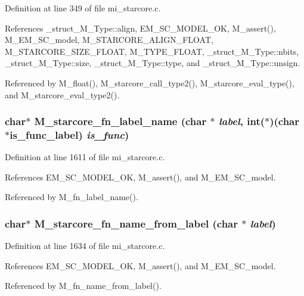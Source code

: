 Definition at line 349 of file mi\_\-starcore.c.

References \_\-struct\_\-M\_\-Type::align, EM\_\-SC\_\-MODEL\_\-OK, M\_\-assert(), M\_\-EM\_\-SC\_\-model, M\_\-STARCORE\_\-ALIGN\_\-FLOAT, M\_\-STARCORE\_\-SIZE\_\-FLOAT, M\_\-TYPE\_\-FLOAT, \_\-struct\_\-M\_\-Type::nbits, \_\-struct\_\-M\_\-Type::size, \_\-struct\_\-M\_\-Type::type, and \_\-struct\_\-M\_\-Type::unsign.

Referenced by M\_\-float(), M\_\-starcore\_\-call\_\-type2(), M\_\-starcore\_\-eval\_\-type(), and M\_\-starcore\_\-eval\_\-type2().
\subsubsection{\setlength{\rightskip}{0pt plus 5cm}char$\ast$ M\_\-starcore\_\-fn\_\-label\_\-name (char $\ast$ {\em label}, int($\ast$)(char $\ast$is\_\-func\_\-label) {\em is\_\-func})}\label{m__starcore_8h_a1277d6e6bef03a3c24b733a0ee2340d}




Definition at line 1611 of file mi\_\-starcore.c.

References EM\_\-SC\_\-MODEL\_\-OK, M\_\-assert(), and M\_\-EM\_\-SC\_\-model.

Referenced by M\_\-fn\_\-label\_\-name().
\subsubsection{\setlength{\rightskip}{0pt plus 5cm}char$\ast$ M\_\-starcore\_\-fn\_\-name\_\-from\_\-label (char $\ast$ {\em label})}\label{m__starcore_8h_818e1e776e411a1471bd0e340b85185c}




Definition at line 1634 of file mi\_\-starcore.c.

References EM\_\-SC\_\-MODEL\_\-OK, M\_\-assert(), and M\_\-EM\_\-SC\_\-model.

Referenced by M\_\-fn\_\-name\_\-from\_\-label().
